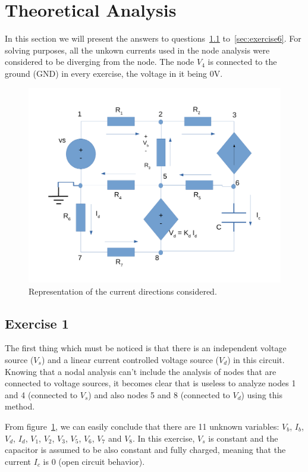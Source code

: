\newpage
\section{Theoretical Analysis}
\label{sec:analysis}

In this section we will present the answers to questions~\ref{sec:exercise1} to~\ref{sec:exercise6}. For solving purposes, all the unkown currents used in the node analysis were considered to be diverging from the node. The node $V_4$ is connected to the ground (GND) in every exercise, the voltage in it being 0V.

\label{sec:Exercise 1}
\begin{figure}[!ht] \centering
\includegraphics[width=0.8\linewidth]{circuit_final.pdf}
\squeezeup 
\caption{Representation of the current directions considered.}
\label{fig:theoretical}
\end{figure}

\subsection{Exercise 1}
\label{sec:exercise1}


 
The first thing which must be noticed is that there is an independent voltage source ($V_s$) and a linear current controlled voltage source ($V_d$) in this circuit. Knowing that a nodal analysis can't include the analysis of nodes that are connected to voltage sources, it becomes clear that is useless to analyze nodes 1 and 4 (connected to $V_s$) and also nodes 5 and 8 (connected to $V_d$) using this method.

From figure~\ref{fig:theoretical}, we can easily conclude that there are 11 unknown variables: $V_b$, $I_b$, $V_d$, $I_d$, $V_1$, $V_2$, $V_3$, $V_5$, $V_6$, $V_7$ and $V_8$. In this exercise, $V_s$ is constant and the capacitor is assumed to be also constant and fully charged, meaning that the current $I_c$ is 0 (open circuit behavior).

